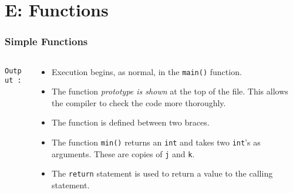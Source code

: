 \section{E: Functions}

\begin{frame}[fragile]
\frametitle{Simple Functions}
\begin{columns}

\begin{column}{0.40\textwidth}

{\scriptsize{\tt Output :}}
\end{column}

\begin{column}{0.50\textwidth}
\begin{itemize}[<+->]
\item Execution begins, as normal, in the \verb^main()^ function.
\item The function {\it prototype is shown} at the top of the file.
This allows the compiler to check the code more thoroughly.
\item The function is defined between two braces.
\item The function \verb^min()^ returns an \verb^int^ and takes
two \verb^int^'s as arguments. These are copies of {\tt j} and {\tt k}.
\item The \verb^return^ statement is used to return a value
to the calling statement.
\end{itemize}
\end{column}

\end{columns}
\end{frame}



